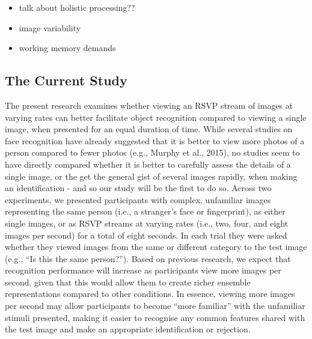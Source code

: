 \documentclass[
  english,
  man]{apa6}
\providecommand{\tightlist}{%
  \setlength{\itemsep}{0pt}\setlength{\parskip}{0pt}}
\begin{document}
\begin{itemize}
\tightlist
\item
  talk about holistic processing??
\item
  image variability
\item
  working memory demands
\end{itemize}

\hypertarget{the-current-study}{%
\subsection{The Current Study}\label{the-current-study}}

The present research examines whether viewing an RSVP stream of images at varying rates can better facilitate object recognition compared to viewing a single image, when presented for an equal duration of time. While several studies on face recognition have already suggested that it is better to view more photos of a person compared to fewer photos (e.g., Murphy et al., 2015), no studies seem to have directly compared whether it is better to carefully assess the details of a single image, or the get the general gist of several images rapidly, when making an identification - and so our study will be the first to do so. Across two experiments, we presented participants with complex, unfamiliar images representing the same person (i.e., a stranger's face or fingerprint), as either single images, or as RSVP streams at varying rates (i.e., two, four, and eight images per second) for a total of eight seconds. In each trial they were asked whether they viewed images from the same or different category to the test image (e.g., ``Is this the same person?''). Based on previous research, we expect that recognition performance will increase as participants view more images per second, given that this would allow them to create richer ensemble representations compared to other conditions. In essence, viewing more images per second may allow participants to become ``more familiar'' with the unfamiliar stimuli presented, making it easier to recognise any common features shared with the test image and make an appropriate identification or rejection.
\end{document}
